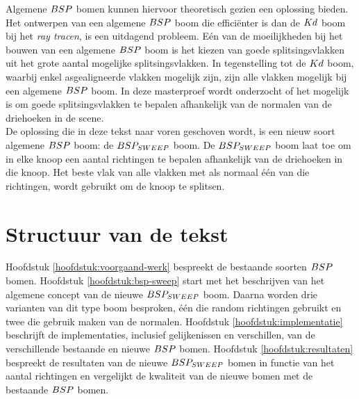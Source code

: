 Algemene $BSP$ bomen kunnen hiervoor theoretisch gezien een oplossing bieden.
Het ontwerpen van een algemene $BSP$ boom die efficiënter is dan de $Kd$ boom bij het \textit{ray tracen}, is een uitdagend probleem.
Eén van de moeilijkheden bij het bouwen van een algemene $BSP$ boom is het kiezen van goede splitsingsvlakken uit het grote aantal mogelijke splitsingsvlakken.
In tegenstelling tot de $Kd$ boom, waarbij enkel asgealigneerde vlakken mogelijk zijn, zijn alle vlakken mogelijk bij een algemene $BSP$ boom.
In deze masterproef wordt onderzocht of het mogelijk is om goede splitsingsvlakken te bepalen afhankelijk van de normalen van de driehoeken in de scene.\\

De oplossing die in deze tekst naar voren geschoven wordt, is een nieuw soort algemene $BSP$ boom: de $BSP_{SWEEP}$ boom.
De $BSP_{SWEEP}$ boom laat toe om in elke knoop een aantal richtingen te bepalen afhankelijk van de driehoeken in die knoop.
Het beste vlak van alle vlakken met als normaal één van die richtingen, wordt gebruikt om de knoop te splitsen.

\section{Structuur van de tekst}
Hoofdstuk \ref{hoofdstuk:voorgaand-werk} bespreekt de bestaande soorten $BSP$ bomen. Hoofdstuk \ref{hoofdstuk:bsp-sweep} start met het beschrijven van het algemene concept van de nieuwe $BSP_{SWEEP}$ boom. Daarna worden drie varianten van dit type boom besproken, één die random richtingen gebruikt en twee die gebruik maken van de normalen. Hoofdstuk \ref{hoofdstuk:implementatie} beschrijft de implementaties, inclusief gelijkenissen en verschillen, van de verschillende bestaande en nieuwe $BSP$ bomen. Hoofdstuk \ref{hoofdstuk:resultaten} bespreekt de resultaten van de nieuwe $BSP_{SWEEP}$ bomen in functie van het aantal richtingen en vergelijkt de kwaliteit van de nieuwe bomen met de bestaande $BSP$ bomen.

